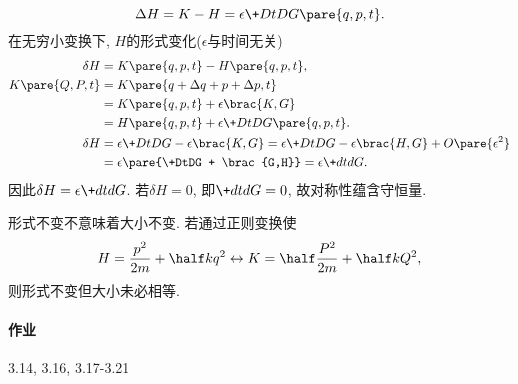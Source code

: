 \documentclass{ctexart}
\begin{document}
\[ \Delta H = K - H = \epsilon \+DtD{G\pare{q,p,t}}. \]
在无穷小变换下, $H$的形式变化($\epsilon$与时间无关)
\begin{align*}
    \delta H &= K\pare{q,p,t} - H\pare{q,p,t}, \\
    K\pare{Q,P,t} &= K\pare{q+\Delta q + p+\Delta p, t} \\ &= K\pare{q,p,t} + \epsilon\brac{K,G} \\
    &= H\pare{q,p,t} + \epsilon \+DtD{G\pare{q,p,t}}. \\
    \delta H &= \epsilon \+DtDG - \epsilon\brac{K,G} = \epsilon \+DtDG - \epsilon\brac{H,G} + O\pare{\epsilon^2} \\
    &= \epsilon\pare{\+DtDG + \brac{G,H}} = \epsilon \+dtdG.
\end{align*}
因此$\displaystyle \delta H = \epsilon \+dtdG$. 若$\delta H = 0$, 即$\displaystyle \+dtdG = 0$, 故对称性蕴含守恒量.
\begin{remark}
    形式不变不意味着大小不变. 若通过正则变换使
    \[ H = \frac{p^2}{2m} + \half kq^2 \leftrightarrow K = \half \frac{P^2}{2m} + \half kQ^2, \]
    则形式不变但大小未必相等.
\end{remark}

\paragraph{作业} %
\label{par:作业}

3.14, 3.16, 3.17-3.21

\end{document}
